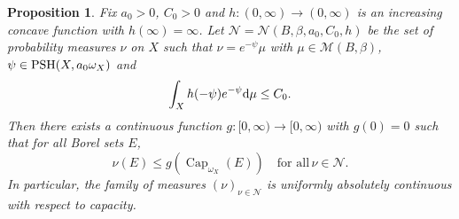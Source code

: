 \documentclass[a4paper,11pt]{amsart}
\numberwithin{equation}{section}
\newtheorem{proposition}[theorem]{Proposition}
\theoremstyle{definition}
\newcommand{\dist}{\mathop{\mathrm{dist}}\nolimits}
\newcommand{\PSH}{{\rm PSH}}
\newcommand{\capacity}{\mathop{\mathrm{Cap}}\nolimits}
\begin{document}
\begin{proposition} \label{prop: unif-capa}
Fix $a_0>0$, $ C_0>0$ and $h: (0, \infty)\rightarrow (0, \infty)$ is an increasing concave function with $h(\infty)=\infty$.
Let $\mathcal{N}=\mathcal{N}(B,\beta, a_0,C_0,h)$ be the set of probability measures $\nu$ on $X$ such that $\nu=e^{-\psi}\mu$ with $\mu\in\mathcal{M}(B,\beta)$, $\psi\in\PSH(X, a_0\omega_X)$ and  \begin{equation}\label{eq: assumption H}
    \int_Xh(-\psi)e^{-\psi}{\rm d}\mu\leq C_0.
\end{equation}  
Then there exists a continuous function $g\colon [0,\infty)\to [0,\infty)$ with $g(0)=0$ such that for all Borel sets $E$,
\[\nu(E)\leq g(\capacity_{\omega_X}(E)) \quad\text{for all}\,\nu\in\mathcal{N}.\]
In particular, the family of measures $(\nu)_{\nu\in\mathcal{N}}$ is uniformly absolutely
continuous with respect to capacity.
\end{proposition}
\end{document}
